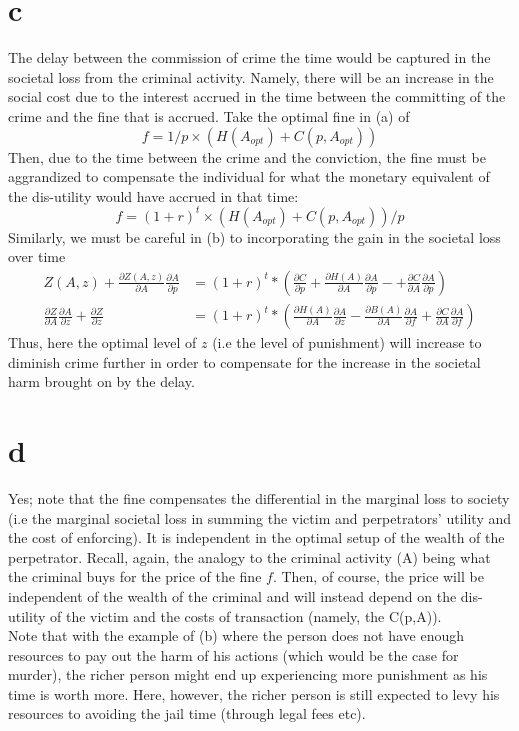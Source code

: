 \documentclass[12pt]{paper}
\begin{document}
\section*{c}
The delay between the commission of crime the time would be captured
in the societal loss from the criminal activity. Namely, there will be
an increase in the social cost due to the interest accrued in the time
between the committing of the crime and the fine that is accrued. Take
the optimal fine in (a) of
$$ f = 1/p \times (H(A_{opt}) + C(p,A_{opt})) $$ Then, due to the time
between the crime and the conviction, the fine must
be aggrandized to compensate the individual for what the monetary
equivalent of the dis-utility would have accrued in that time:
$$ f = (1+r)^t \times (H(A_{opt}) + C(p,A_{opt}))/p $$ Similarly, we must
be careful in (b) to incorporating the gain in the societal loss over
time
\begin{align*} 
   Z(A,z) + \frac{\partial Z(A,z)}{\partial A}\frac{\partial A}{\partial p} &= (1+r)^t *(\frac{\partial C}{\partial p}  + \frac{\partial{H(A)}}{ \partial{A}} \frac{ \partial{A}}{\partial{p}} -  + \frac{\partial{C}}{\partial{A}}\frac{\partial{A}}{\partial{p}})\\
 \frac{\partial{Z}}{\partial{A}} \frac{\partial{A}}{\partial{z}} + \frac{\partial{Z}}{\partial{z}} &= (1+r)^t*(\frac{\partial{H(A)}}{\partial{A}} \frac{\partial{A}}{\partial{z}} - \frac{\partial{B(A)}}{\partial{A}}\frac{\partial{A}}{\partial{f}} + \frac{\partial{C}}{\partial{A}}\frac{\partial{A}}{\partial{f}})
\end{align*}
Thus, here the optimal level of $z$ (i.e the level of punishment) will
increase to diminish crime further in order to compensate for the
increase in the societal harm brought on by the delay.
\section*{d}
Yes; note that the fine compensates the differential in the marginal
loss to society (i.e the marginal societal loss in summing the victim
and perpetrators' utility and the cost of enforcing). It is
independent in the optimal setup of the wealth of the
perpetrator. Recall, again, the analogy to the criminal activity (A)
being what the criminal buys for the price of the fine $f$. Then, of
course, the price will be independent of the wealth of the criminal
and will instead depend on the dis-utility of the victim and the costs
of transaction (namely, the C(p,A)).\\ 
Note that with the example of (b) where the person does not have
enough resources to pay out the harm of his actions (which would be
the case for murder), the richer person might end up experiencing more
punishment as his time is worth more. Here, however, the richer person
is still expected to levy his resources to avoiding the jail time
(through legal fees etc).  \pagebreak
\end{document}
